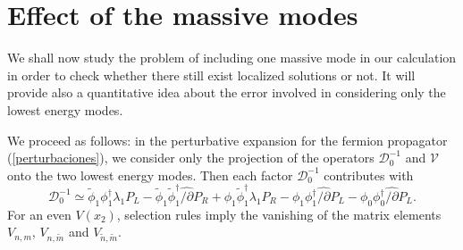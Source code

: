 \documentclass[a4paper,12pt]{article}
\begin{document}
{{\section{Effect of the massive modes}\label{disc}
We shall now study the problem of including one massive mode in our
calculation in order to check whether there still exist localized
solutions or not.  It will provide also a quantitative idea about the
error involved in considering only the lowest energy modes.

We proceed as follows: in the perturbative expansion for the fermion
propagator (\ref{perturbaciones}), we consider only the projection of
the operators ${\mathcal D}_0^{-1}$ and ${\mathcal V}$ onto the two
lowest energy modes. Then each factor ${\mathcal D}_0^{-1}$
contributes with
 \begin{equation}
{\mathcal D}_0^{-1} \simeq \widetilde{\phi}_1\phi^{\dagger}_1
\lambda_1 P_L - \widetilde{\phi}_1 \widetilde{\phi}^{\dagger}_1
\widehat{/\!\!\!\partial} P_R + \phi_1
\widetilde{\phi}^{\dagger}_1 \lambda_1 P_R - \phi_1
\phi^{\dagger}_1 \widehat{/\!\!\!\partial} P_L -
\phi_0\phi^{\dagger}_0 \widehat{/\!\!\!\partial} P_L
\label{ordencero}.
\end{equation}
For an even $V(x_2)$, selection rules imply the vanishing of the
matrix elements $V_{n,m}$, $V_{n,\tilde m}$ and $V_{\tilde n,\tilde
  m}$.

}}
\end{document}
